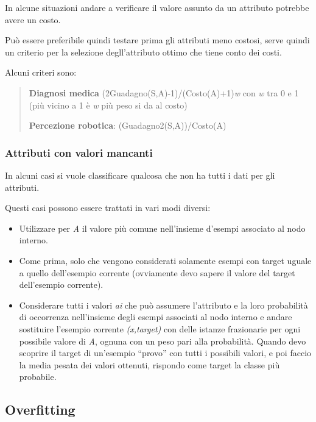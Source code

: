 In alcune situazioni andare a verificare il valore assunto da un
attributo potrebbe avere un costo.

Può essere preferibile quindi testare prima gli attributi meno costosi,
serve quindi un criterio per la selezione degll'attributo ottimo che
tiene conto dei costi.

Alcuni criteri sono:

\begin{quote}
\textbf{Diagnosi medica} (2Guadagno(S,A)-1)/(Costo(A)+1)\emph{w} con
\emph{w} tra 0 e 1 (più vicino a 1 è \emph{w} più peso si da al costo)

\textbf{Percezione robotica}: (Guadagno2(S,A))/Costo(A)
\end{quote}

\subsubsection{Attributi con valori
mancanti}\label{attributi-con-valori-mancanti}

In alcuni casi si vuole classificare qualcosa che non ha tutti i dati
per gli attributi.

Questi casi possono essere trattati in vari modi diversi:

\begin{itemize}
\tightlist
\item
  Utilizzare per \emph{A} il valore più comune nell'insieme d'esempi
  associato al nodo interno.
\item
  Come prima, solo che vengono considerati solamente esempi con target
  uguale a quello dell'esempio corrente (ovviamente devo sapere il
  valore del target dell'esempio corrente).
\item
  Considerare tutti i valori \emph{ai} che può assumere l'attributo e la
  loro probabilità di occorrenza nell'insieme degli esempi associati al
  nodo interno e andare sostituire l'esempio corrente \emph{(x,target)}
  con delle istanze frazionarie per ogni possibile valore di \emph{A},
  ognuna con un peso pari alla probabilità. Quando devo scoprire il
  target di un'esempio ``provo'' con tutti i possibili valori, e poi
  faccio la media pesata dei valori ottenuti, rispondo come target la
  classe più probabile.
\end{itemize}

\subsection{Overfitting}\label{overfitting}

